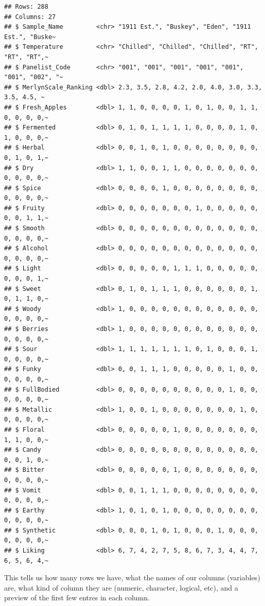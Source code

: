 \documentclass[
]{book}
\begin{document}
\begin{verbatim}
## Rows: 288
## Columns: 27
## $ Sample_Name         <chr> "1911 Est.", "Buskey", "Eden", "1911 Est.", "Buske~
## $ Temperature         <chr> "Chilled", "Chilled", "Chilled", "RT", "RT", "RT",~
## $ Panelist_Code       <chr> "001", "001", "001", "001", "001", "001", "002", "~
## $ MerlynScale_Ranking <dbl> 2.3, 3.5, 2.8, 4.2, 2.0, 4.0, 3.0, 3.3, 3.5, 4.5, ~
## $ Fresh_Apples        <dbl> 1, 1, 0, 0, 0, 0, 1, 0, 1, 0, 0, 1, 1, 0, 0, 0, 0,~
## $ Fermented           <dbl> 0, 1, 0, 1, 1, 1, 1, 0, 0, 0, 0, 1, 0, 1, 0, 0, 0,~
## $ Herbal              <dbl> 0, 0, 1, 0, 1, 0, 0, 0, 0, 0, 0, 0, 0, 0, 1, 0, 1,~
## $ Dry                 <dbl> 1, 1, 0, 0, 1, 1, 0, 0, 0, 0, 0, 0, 0, 0, 0, 0, 0,~
## $ Spice               <dbl> 0, 0, 0, 0, 1, 0, 0, 0, 0, 0, 0, 0, 0, 0, 0, 0, 0,~
## $ Fruity              <dbl> 0, 0, 0, 0, 0, 0, 0, 1, 0, 0, 0, 0, 0, 0, 0, 1, 1,~
## $ Smooth              <dbl> 0, 0, 0, 0, 0, 0, 0, 0, 0, 0, 0, 0, 0, 0, 0, 0, 0,~
## $ Alcohol             <dbl> 0, 0, 0, 0, 0, 0, 0, 0, 0, 0, 0, 0, 0, 0, 0, 0, 0,~
## $ Light               <dbl> 0, 0, 0, 0, 0, 1, 1, 1, 0, 0, 0, 0, 0, 0, 0, 0, 1,~
## $ Sweet               <dbl> 0, 1, 0, 1, 1, 1, 0, 0, 0, 0, 0, 0, 1, 0, 1, 1, 0,~
## $ Woody               <dbl> 1, 0, 0, 0, 0, 0, 0, 0, 0, 0, 0, 0, 0, 0, 0, 0, 0,~
## $ Berries             <dbl> 1, 0, 0, 0, 0, 0, 0, 0, 0, 0, 0, 0, 0, 0, 0, 0, 0,~
## $ Sour                <dbl> 1, 1, 1, 1, 1, 1, 1, 0, 1, 0, 0, 0, 1, 0, 0, 0, 0,~
## $ Funky               <dbl> 0, 0, 1, 1, 1, 0, 0, 0, 0, 0, 1, 0, 0, 0, 0, 0, 0,~
## $ FullBodied          <dbl> 0, 0, 0, 0, 0, 0, 0, 0, 0, 0, 1, 0, 0, 0, 0, 0, 0,~
## $ Metallic            <dbl> 1, 0, 0, 1, 0, 0, 0, 0, 0, 0, 0, 1, 0, 0, 0, 0, 0,~
## $ Floral              <dbl> 0, 0, 0, 0, 0, 1, 0, 0, 0, 0, 0, 0, 0, 1, 1, 0, 0,~
## $ Candy               <dbl> 0, 0, 0, 0, 0, 0, 0, 0, 0, 0, 0, 0, 0, 0, 0, 1, 0,~
## $ Bitter              <dbl> 0, 0, 0, 0, 0, 1, 0, 0, 0, 0, 0, 0, 0, 0, 0, 0, 0,~
## $ Vomit               <dbl> 0, 0, 1, 1, 1, 0, 0, 0, 0, 0, 0, 0, 0, 0, 0, 0, 0,~
## $ Earthy              <dbl> 1, 0, 1, 0, 1, 0, 0, 0, 0, 0, 0, 0, 0, 0, 0, 0, 0,~
## $ Synthetic           <dbl> 0, 0, 0, 1, 0, 1, 0, 0, 0, 1, 0, 0, 0, 0, 0, 0, 0,~
## $ Liking              <dbl> 6, 7, 4, 2, 7, 5, 8, 6, 7, 3, 4, 4, 7, 6, 5, 6, 4,~
\end{verbatim}

This tells us how many rows we have, what the names of our columns (variables) are, what kind of column they are (numeric, character, logical, etc), and a preview of the first few entres in each column.
\end{document}
